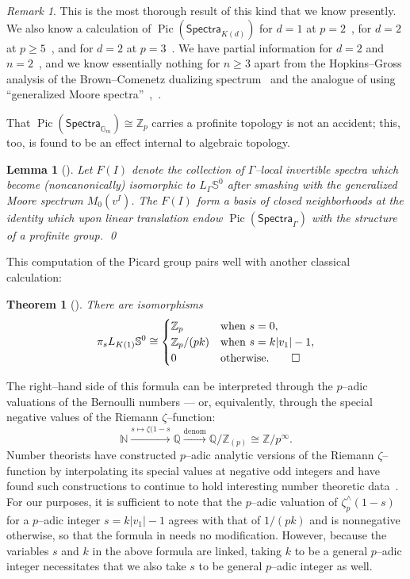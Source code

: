 \documentclass{amsart}
\newcommand{\Z}{\mathbb Z}
\renewcommand{\S}{\mathbb S}
\newcommand{\G}{\mathbb G}
\newcommand{\Q}{\mathbb{Q}}
\newcommand{\<}{\langle}
\renewcommand{\>}{\rangle}
\newcommand{\CatOf}[1]{\mathsf{#1}}
\DeclareMathOperator{\Pic}{Pic}
\theoremstyle{plain}
\newtheorem*{theorem}{Theorem}
\newtheorem*{lemma}{Lemma}
\theoremstyle{definition}
\theoremstyle{remark}
\newtheorem*{remark}{Remark}
\begin{document}
\begin{remark}\label{PicardGroupsWeKnow}
This is the most thorough result of this kind that we know presently.  We also know a calculation of $\Pic(\CatOf{Spectra}_{K(d)})$ for $d = 1$ at $p = 2$~\cite[Theorem 3.3]{HMS}, for $d = 2$ at $p \ge 5$~\cite[Theorem 8.1]{BehrensRevisited}, and for $d = 2$ at $p = 3$~\cite[Theorem 1.2]{GHMR}.  We have partial information for $d = 2$ and $n = 2$~\cite[pg.\ 50]{StricklandInterpolate}, and we know essentially nothing for $n \ge 3$ apart from the Hopkins--Gross analysis of the Brown--Comenetz dualizing spectrum~\cite[Theorem 6]{HopkinsGrossAnnouncement} and the analogue of  using ``generalized Moore spectra''~\cite[Proposition 5.14]{HopkinsSmith},~\cite[Proposition 9.2-3]{HMS}.
\end{remark}

That $\Pic(\CatOf{Spectra}_{\G_m}) \cong \Z_p$ carries a profinite topology is not an accident; this, too, is found to be an effect internal to algebraic topology.
\begin{lemma}[{\cite[Proposition 14.3.d]{HoveyStrickland}}]
Let $F(I)$ denote the collection of $\Gamma$--local invertible spectra which become (noncanonically) isomorphic to $L_\Gamma \S^0$ after smashing with the generalized Moore spectrum $M_0(v^I)$.  The $F(I)$ form a basis of closed neighborhoods at the identity which upon linear translation endow $\Pic(\CatOf{Spectra}_\Gamma)$ with the structure of a profinite group. \qed
\end{lemma}

This computation of the Picard group pairs well with another classical calculation:
\begin{theorem}[{\cite[Theorem 1.5]{AdamsJXIV}}]\label{UnpretentiousCalculation}
There are isomorphisms \[\pi_s L_{K(1)} \S^0 \cong \begin{cases} \Z_p & \text{when $s = 0$}, \\ \Z_p / (pk) & \text{when $s = k|v_1| - 1$}, \\ 0 & \text{otherwise}. \qed \end{cases}\]
\end{theorem}

\noindent The right--hand side of this formula can be interpreted through the $p$--adic valuations of the Bernoulli numbers --- or, equivalently, through the special negative values of the Riemann $\zeta$--function: \[\mathbb N \xrightarrow{s \mapsto \zeta(1 - s} \Q \xrightarrow{\text{denom}} \Q / \Z_{(p)} \cong \Z / p^\infty.\]  Number theorists have constructed $p$--adic analytic versions of the Riemann $\zeta$--function by interpolating its special values at negative odd integers and have found such constructions to continue to hold interesting number theoretic data~\cite{Iwasawa}.  For our purposes, it is sufficient to note that the $p$--adic valuation of $\zeta^\wedge_p(1-s)$ for a $p$--adic integer $s = k|v_1| - 1$ agrees with that of $1/(pk)$ and is nonnegative otherwise, so that the formula in  needs no modification.  However, because the variables $s$ and $k$ in the above formula are linked, taking $k$ to be a general $p$--adic integer necessitates that we also take $s$ to be general $p$--adic integer as well.
\end{document}

